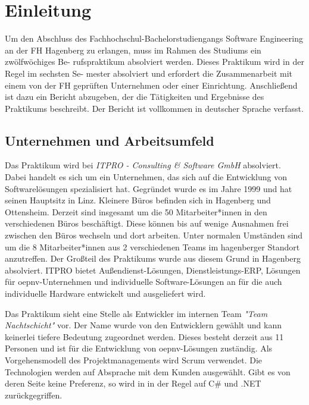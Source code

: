 \chapter{Einleitung}\label{chap:einleitung}
    Um den Abschluss des Fachhochschul-Bachelorstudiengangs Software Engineering an
    der FH Hagenberg zu erlangen, muss im Rahmen des Studiums ein zwölfwöchiges Be-
    rufspraktikum absolviert werden. Dieses Praktikum wird in der Regel im sechsten Se-
    mester absolviert und erfordert die Zusammenarbeit mit einem von der FH geprüften
    Unternehmen oder einer Einrichtung. Anschließend ist dazu ein Bericht abzugeben, der
    die Tätigkeiten und Ergebnisse des Praktikums beschreibt. Der
    Bericht ist vollkommen in deutscher Sprache verfasst.

\section{Unternehmen und Arbeitsumfeld}\label{sec:unternehmen-und-arbeitsumfeld}
    Das Praktikum wird bei \emph{ITPRO - Consulting \& Software GmbH} \cite{ITPRO} absolviert. Dabei handelt es sich um ein Unternehmen, das sich auf die Entwicklung von Softwarelösungen 
    spezialisiert hat. Gegründet wurde es im Jahre 1999 und hat seinen Hauptsitz in Linz. Kleinere Büros befinden sich in Hagenberg und Ottensheim. Derzeit sind insgesamt um die 
    50 Mitarbeiter*innen in den verschiedenen Büros beschäftigt. Diese können bis auf wenige Ausnahmen frei zwischen den Büros wechseln und dort arbeiten. Unter normalen Umständen sind 
    um die 8 Mitarbeiter*innen  aus 2 verschiedenen Teams im hagenberger Standort anzutreffen.
    Der Großteil des Praktikums wurde aus diesem Grund in Hagenberg absolviert.
    ITPRO bietet Außendienst-Lösungen, Dienstleistungs-ERP, Lösungen für \gls{oepnv}-Unternehmen und individuelle Software-Lösungen an für die auch individuelle Hardware entwickelt
    und ausgeliefert wird.

    Das Praktikum sieht eine Stelle als Entwickler im internen Team \emph{"Team Nachtschicht"} vor. Der Name wurde von den Entwicklern gewählt und kann keinerlei tiefere Bedeutung zugeordnet werden.
    Dieses besteht derzeit aus 11 Personen und ist für die Entwicklung 
    von \gls{oepnv}-Lösungen zuständig. Als Vorgehensmodell des Projektmanagements wird Scrum verwendet. Die Technologien werden auf Absprache mit dem Kunden ausgewählt. Gibt es von deren Seite keine
    Preferenz, so wird in in der Regel auf C\# und .NET zurückgegriffen.

